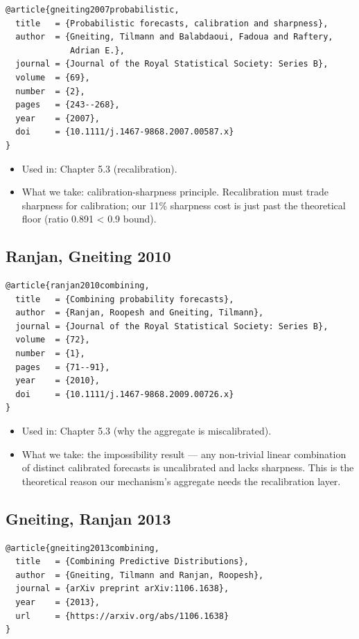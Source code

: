 \documentclass[11pt,a4paper,openany]{report}
\begin{document}
\begin{verbatim}
@article{gneiting2007probabilistic,
  title   = {Probabilistic forecasts, calibration and sharpness},
  author  = {Gneiting, Tilmann and Balabdaoui, Fadoua and Raftery,
             Adrian E.},
  journal = {Journal of the Royal Statistical Society: Series B},
  volume  = {69},
  number  = {2},
  pages   = {243--268},
  year    = {2007},
  doi     = {10.1111/j.1467-9868.2007.00587.x}
}
\end{verbatim}

\begin{itemize}
  \item Used in: Chapter 5.3 (recalibration).
  \item What we take: calibration-sharpness principle. Recalibration must
    trade sharpness for calibration; our 11\% sharpness cost is just past
    the theoretical floor (ratio 0.891 < 0.9 bound).
\end{itemize}

\subsection{Ranjan, Gneiting 2010}

\begin{verbatim}
@article{ranjan2010combining,
  title   = {Combining probability forecasts},
  author  = {Ranjan, Roopesh and Gneiting, Tilmann},
  journal = {Journal of the Royal Statistical Society: Series B},
  volume  = {72},
  number  = {1},
  pages   = {71--91},
  year    = {2010},
  doi     = {10.1111/j.1467-9868.2009.00726.x}
}
\end{verbatim}

\begin{itemize}
  \item Used in: Chapter 5.3 (why the aggregate is miscalibrated).
  \item What we take: the impossibility result — any non-trivial linear
    combination of distinct calibrated forecasts is uncalibrated and
    lacks sharpness. This is the theoretical reason our mechanism's
    aggregate needs the recalibration layer.
\end{itemize}

\subsection{Gneiting, Ranjan 2013}

\begin{verbatim}
@article{gneiting2013combining,
  title   = {Combining Predictive Distributions},
  author  = {Gneiting, Tilmann and Ranjan, Roopesh},
  journal = {arXiv preprint arXiv:1106.1638},
  year    = {2013},
  url     = {https://arxiv.org/abs/1106.1638}
}
\end{verbatim}
\end{document}
